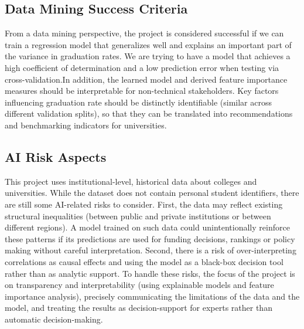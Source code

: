 \documentclass[sigconf]{acmart}
\begin{document}
\subsection{Data Mining Success Criteria}
From a data mining perspective, the project is considered successful if
we can train a regression model that generalizes well and explains an important
 part of the variance in graduation rates. We are trying to have a model that
 achieves a high coefficient of determination and a low prediction error
 when testing via cross-validation.In addition, the learned model and derived
 feature importance measures should be interpretable for non-technical stakeholders.
 Key factors influencing graduation rate should be distinctly identifiable
 (similar across different validation splits), so that they can be translated
 into recommendations and benchmarking indicators for universities.
\subsection{AI Risk Aspects}
This project uses institutional-level, historical data about colleges and
universities. While the dataset does not contain personal student identifiers,
there are still some AI-related risks to consider. First, the data may reflect
existing structural inequalities (between public and private institutions or
between different regions). A model trained on such data could unintentionally
reinforce these patterns if its predictions are used for funding decisions,
 rankings or policy making without careful interpretation. Second, there is
 a risk of over-interpreting correlations as causal effects and using the
 model as a black-box decision tool rather than as analytic support. To handle
  these risks, the focus of the project is on transparency and interpretability
  (using explainable models and feature importance analysis), precisely
  communicating the limitations of the data and the model, and treating the
  results as decision-support for experts rather than automatic decision-making.
\end{document}
